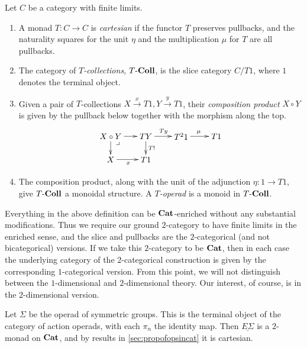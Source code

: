 \begin{Defi}
Let $C$ be a category with finite limits.
\begin{enumerate}
\item A monad $T \colon C \rightarrow C$ is \textit{cartesian} if the functor $T$ preserves pullbacks, and the naturality squares for the unit $\eta$ and the multiplication $\mu$ for $T$ are all pullbacks.
\item The category of \textit{$T$-collections}, $T\mbox{-}\mathbf{Coll}$, is the slice category $C/T1$, where $1$ denotes the terminal object.
\item Given a pair of $T$-collections $X \stackrel{x}{\rightarrow} T1, Y \stackrel{y}{\rightarrow} T1$, their \textit{composition product} $X \circ Y$ is given by the pullback below together with the morphism along the top.
  \[
    \xy
      (0,0)*+{X \circ Y} ="00";
      (15,0)*+{TY} ="10";
      (30,0)*+{T^{2}1} ="20";
      (45,0)*+{T1} ="30";
      (0,-10)*+{X} ="01";
      (15,-10)*+{T1} ="11";
      {\ar^{} "00" ; "10"};
      {\ar^{Ty} "10" ; "20"};
      {\ar^{\mu} "20" ; "30"};
      {\ar^{T!} "10" ; "11"};
      {\ar_{x} "01" ; "11"};
      {\ar^{} "00" ; "01"};
      (3,-3)*{\lrcorner};
    \endxy
  \]
\item The composition product, along with the unit of the adjunction $\eta \colon 1 \rightarrow T1$, give $T\mbox{-}\mathbf{Coll}$ a monoidal structure. A \textit{$T$-operad} is a monoid in $T\mbox{-}\mathbf{Coll}$.
\end{enumerate}
\end{Defi}

\begin{rem}
Everything in the above definition can be $\mathbf{Cat}$-enriched without any substantial modifications. Thus we require our ground $2$-category to have finite limits in the enriched sense, and the slice and pullbacks are the $2$-categorical (and not bicategorical) versions. If we take this $2$-category to be $\mathbf{Cat}$, then in each case the underlying category of the $2$-categorical construction is given by the corresponding $1$-categorical version. From this point, we will not distinguish between the $1$-dimensional and $2$-dimensional theory. Our interest, of course, is in the $2$-dimensional version.
\end{rem}

Let $\Sigma$ be the operad of symmetric groups. This is the terminal object of the category of action operads, with each $\pi_{n}$ the identity map. Then $\underline{E\Sigma}$ is a $2$-monad on $\mathbf{Cat}$, and by results in \cref{sec:propofopsincat} it is cartesian.

